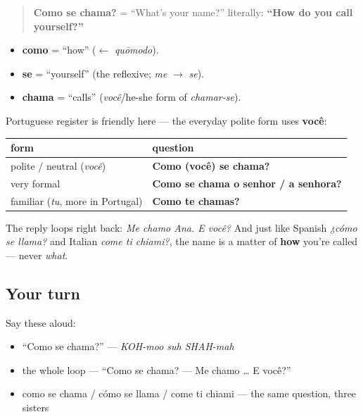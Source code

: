 \begin{cousinweb}
\begin{quote}
\textbf{Como se chama?} = \textquotedblleft{}What's your name?\textquotedblright{} literally: \textbf{\textquotedblleft{}How do you call yourself?\textquotedblright{}}
\end{quote}

\begin{itemize}
\raggedright
  \item \textbf{como} = \textquotedblleft{}how\textquotedblright{} ($\leftarrow$ \emph{quōmodo}).
  \item \textbf{se} = \textquotedblleft{}yourself\textquotedblright{} (the reflexive; \emph{me} $\to$ \emph{se}).
  \item \textbf{chama} = \textquotedblleft{}calls\textquotedblright{} (\emph{você}/he-she form of \emph{chamar-se}).
\end{itemize}

Portuguese register is friendly here — the everyday polite form uses \textbf{você}:

\noindent
\begin{tabularx}{\linewidth}{@{}>{\raggedright\arraybackslash}X>{\raggedright\arraybackslash}X@{}}
\toprule
\textbf{form} & \textbf{question} \\
\midrule
polite / neutral (\emph{você}) & \textbf{Como (você) se chama?} \\
very formal & \textbf{Como se chama o senhor / a senhora?} \\
familiar (\emph{tu}, more in Portugal) & \textbf{Como te chamas?} \\
\bottomrule
\end{tabularx}

The reply loops right back: \emph{Me chamo Ana. E você?} And just like Spanish \emph{¿cómo se llama?} and Italian \emph{come ti chiami?}, the name is a matter of \textbf{how} you're called — never \emph{what}.
\end{cousinweb}

\subsection*{Your turn}
Say these aloud:

\begin{itemize}
\raggedright
  \item \textquotedblleft{}Como se chama?\textquotedblright{} — \emph{KOH-moo suh SHAH-mah}
  \item the whole loop — \textquotedblleft{}Como se chama? — Me chamo … E você?\textquotedblright{}
  \item como se chama / cómo se llama / come ti chiami — the same question, three sisters
\end{itemize}

